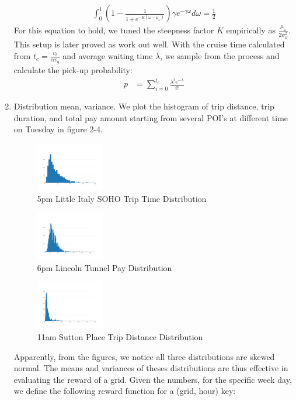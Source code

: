 \documentclass[letterpaper, 10 pt, conference]{ieeeconf}
\begin{document}
\begin{enumerate}
\begin{align}
\int_{0}^{1}(1-\frac{1}{1+e^{-K(\omega-\mu_\omega)}})\gamma e^{-\gamma\omega}d\omega = \frac{1}{2}
\end{align}
For this equation to hold, we tuned the steepness factor $K$ empirically as $\frac{\mu_\omega}{2\sigma_\omega^2}$. This setup is later proved as work out well.
With the cruise time calculated from $t_c = \frac{v_t}{\alpha v_g}$ and average waiting time $\lambda$, we sample from the process and calculate the pick-up probability:
\begin{align}
p &= \sum_{i=0}^{t_c}\frac{\lambda^ie^{-\lambda}}{i!}
\end{align}
\item Distribution mean, variance. We plot the histogram of trip distance, trip duration, and total pay amount starting from several POI's at different time on Tuesday in figure 2-4.
\begin{figure}
\centering
\includegraphics[width=0.28\textwidth]{5pm-littleitaly-soho-triptime.jpeg}
\caption{5pm Little Italy SOHO Trip Time Distribution}
\end{figure}
\begin{figure}
\centering
\includegraphics[width=0.28\textwidth]{18-lincoln-tunnel-pay.jpeg}
\caption{6pm Lincoln Tunnel Pay Distribution}
\end{figure}
\begin{figure}
\centering
\includegraphics[width=0.28\textwidth]{11am-sutton-place-dist.jpeg}
\caption{11am Sutton Place Trip Distance Distribution}
\end{figure}
Apparently, from the figures, we notice all three distributions are skewed normal. The means and variances of theses distributions are thus effective in evaluating the reward of a grid. Given the numbers, for the specific week day, we define the following reward function for a (grid, hour) key:

\end{enumerate}
\end{document}
